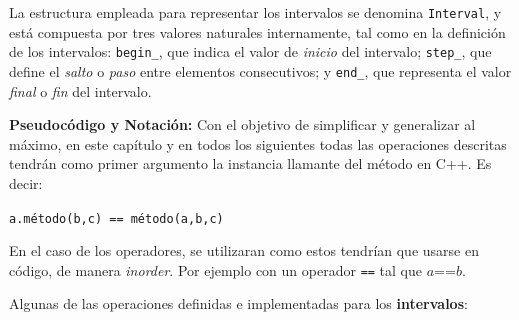 La estructura empleada para representar los intervalos se denomina \texttt{Interval}, y está compuesta por tres valores naturales internamente, tal como en la definición de los intervalos: \texttt{begin\_}, que indica el valor de \textit{inicio} del intervalo; \texttt{step\_}, que define el \textit{salto} o \textit{paso} entre elementos consecutivos; y \texttt{end\_}, que representa el valor \textit{final} o \textit{fin} del intervalo. 

\textbf{Pseudocódigo y Notación:} Con el objetivo de simplificar y generalizar al máximo, en este capítulo y en todos los siguientes todas las operaciones descritas tendrán como primer argumento la instancia llamante del método en C++. Es decir:
\begin{center}
    \texttt{a.método(b,c) == método(a,b,c)}
\end{center}

En el caso de los operadores, se utilizaran como estos tendrían que usarse en código, de manera \textit{inorder}. Por ejemplo con un operador \texttt{==} tal que $a \texttt{==}b$.


Algunas de las operaciones definidas e implementadas para los \textbf{intervalos}:

